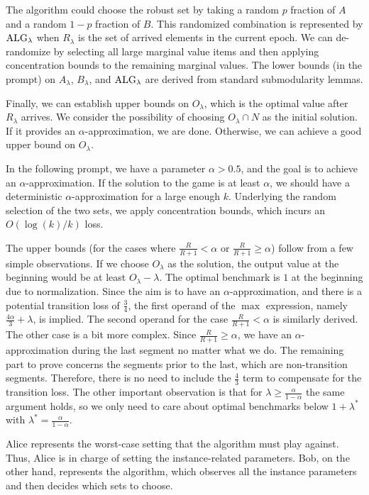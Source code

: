 \documentclass[11pt]{article}
\newcommand{\ALG}{\textnormal{ALG}}
\begin{document}
The algorithm could choose the robust set by taking a random $p$ fraction of $A$ and a random $1-p$ fraction of $B$. This randomized combination is represented by $\ALG_{\lambda}$ when $R_{\lambda}$ is the set of arrived elements in the current epoch. We can de-randomize by selecting all large marginal value items and then applying concentration bounds to the remaining marginal values. The lower bounds (in the prompt) on $A_{\lambda}$, $B_{\lambda}$, and $\ALG_{\lambda}$ are derived from standard submodularity lemmas.

Finally, we can establish upper bounds on $O_{\lambda}$, which is the optimal value after $R_{\lambda}$ arrives. We consider the possibility of choosing $O_{\lambda} \cap N$ as the initial solution. If it provides an $\alpha$-approximation, we are done. Otherwise, we can achieve a good upper bound on $O_{\lambda}$.

In the following prompt, we have a parameter $\alpha > 0.5$, and the goal is to achieve an $\alpha$-approximation. If the solution to the game is at least $\alpha$, we should have a deterministic $\alpha$-approximation for a large enough $k$. Underlying the random selection of the two sets, we apply concentration bounds, which incurs an $O(\log(k)/k)$ loss.

The upper bounds (for the cases where $\frac{R}{R+1} < \alpha$ or $\frac{R}{R+1} \ge \alpha$) follow from a few simple observations.
If we choose $O_{\lambda}$ as the solution, the output value at the beginning would be at least $O_{\lambda} - \lambda$. The optimal benchmark is $1$ at the beginning due to normalization.
Since the aim is to have an $\alpha$-approximation, and there is a potential transition loss of $\frac{3}{4}$, the first operand of the $\max$ expression, namely $\frac{4\alpha}{3} + \lambda$, is implied. The second operand for the case $\frac{R}{R+1} < \alpha$ is similarly derived.
The other case is a bit more complex. Since $\frac{R}{R+1} \ge \alpha$, we have an $\alpha$-approximation during the last segment no matter what we do. The remaining part to prove concerns the segments prior to the last, which are non-transition segments. Therefore, there is no need to include the $\frac{4}{3}$ term to compensate for the transition loss. The other important observation is that for $\lambda \ge \frac{\alpha}{1-\alpha}$ the same argument holds, so we only need to care about optimal benchmarks below $1 + \lambda^*$ with $\lambda^* =\frac{\alpha}{1-\alpha}$.

Alice represents the worst-case setting that the algorithm must play against. Thus, Alice is in charge of setting the instance-related parameters.
Bob, on the other hand, represents the algorithm, which observes all the instance parameters and then decides which sets to choose.
\end{document}
